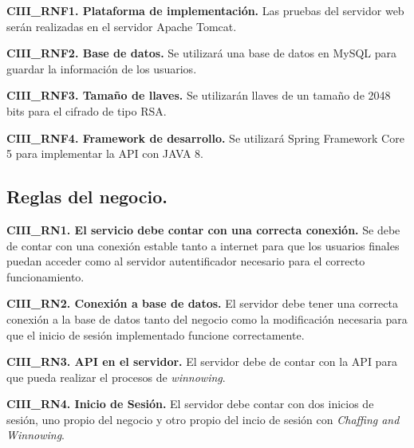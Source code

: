\documentclass[12pt, a4paper, titlepage]{report}
\begin{document}
	                \textbf{CIII\_RNF1. Plataforma de implementación.} Las pruebas del servidor web serán realizadas en el servidor Apache Tomcat.\\
                    \label{CIII_RNF1}

	                \textbf{CIII\_RNF2. Base de datos.} Se utilizará una base de datos en MySQL para guardar la información de los usuarios.\\
	                \label{CIII_RNF2}
	                
	                \textbf{CIII\_RNF3. Tamaño de llaves.} Se utilizarán llaves de un tamaño de 2048 bits para el cifrado de tipo RSA.\\
	                \label{CIII_RNF3}
	                
	                \textbf{CIII\_RNF4. Framework de desarrollo.} Se utilizará Spring Framework Core 5 para implementar la API con JAVA 8.\\
	                \label{CIII_RNF4}
	       
            \subsection{Reglas del negocio.}
	            \textbf{CIII\_RN1. El servicio debe contar con una correcta conexi\'on.} Se debe de contar con una conexión estable tanto a internet para que los usuarios finales puedan acceder como al servidor autentificador necesario para el correcto funcionamiento.\\
	            \label{CIII_RN1}
	            
	            \textbf{CIII\_RN2. Conexión a base de datos.} El servidor debe tener una correcta conexión a la base de datos tanto del negocio como la modificación necesaria para que el inicio de sesión implementado funcione correctamente.\\
	            \label{CIII_RN2}
	            
	            \textbf{CIII\_RN3. API en el servidor.} El servidor debe de contar con la API para que pueda realizar el procesos de \textit{winnowing}.\\
	            \label{CIII_RN3}
	            
	            \textbf{CIII\_RN4. Inicio de Sesi\'on.} El servidor debe contar con dos inicios de sesión, uno propio del negocio y otro propio del incio de sesión con \textit{Chaffing and Winnowing}.\\
	            \label{CIII_RN4}
	            
\end{document}
